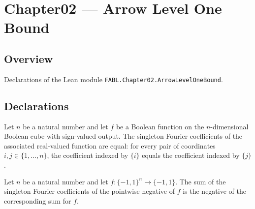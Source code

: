 \chapter{Chapter02 — Arrow Level One Bound}
\section{Overview}

Declarations of the Lean module \texttt{FABL.Chapter02.ArrowLevelOneBound}.

\section{Declarations}

\begin{definition}
\label{FABL.HasEqualSingletonFourierCoefficients}
\leanok
{}
Let $n$ be a natural number and let $f$ be a Boolean function on the $n$-dimensional
Boolean cube with sign-valued output. The singleton Fourier coefficients of the
associated real-valued function are equal: for every pair of coordinates
$i,j\in\{1,\ldots,n\}$, the coefficient indexed by $\{i\}$ equals the coefficient
indexed by $\{j\}$.
\end{definition}

\begin{theorem}
\label{FABL.sum_fourierCoeff_singleton_neg}
\leanok
{}
Let $n$ be a natural number and let $f:\{-1,1\}^n\to\{-1,1\}$. The sum of the singleton
Fourier coefficients of the pointwise negative of $f$ is the negative of the
corresponding sum for $f$.
\end{theorem}


